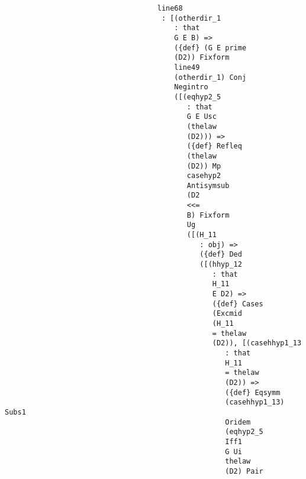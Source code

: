 \documentclass[12pt]{article}
\begin{document}
\begin{verbatim}
                                    line68 
                                     : [(otherdir_1 
                                        : that 
                                        G E B) => 
                                        ({def} (G E prime 
                                        (D2)) Fixform 
                                        line49 
                                        (otherdir_1) Conj 
                                        Negintro 
                                        ([(eqhyp2_5 
                                           : that 
                                           G E Usc 
                                           (thelaw 
                                           (D2))) => 
                                           ({def} Refleq 
                                           (thelaw 
                                           (D2)) Mp 
                                           casehyp2 
                                           Antisymsub 
                                           (D2 
                                           <<= 
                                           B) Fixform 
                                           Ug 
                                           ([(H_11 
                                              : obj) => 
                                              ({def} Ded 
                                              ([(hhyp_12 
                                                 : that 
                                                 H_11 
                                                 E D2) => 
                                                 ({def} Cases 
                                                 (Excmid 
                                                 (H_11 
                                                 = thelaw 
                                                 (D2)), [(casehhyp1_13 
                                                    : that 
                                                    H_11 
                                                    = thelaw 
                                                    (D2)) => 
                                                    ({def} Eqsymm 
                                                    (casehhyp1_13) Subs1 
                                                    Oridem 
                                                    (eqhyp2_5 
                                                    Iff1 
                                                    G Ui 
                                                    thelaw 
                                                    (D2) Pair 

\end{verbatim}
\end{document}
